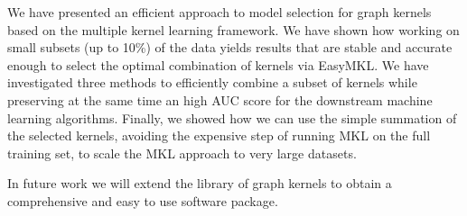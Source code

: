 \documentclass{esannV2}
\newcommand{\1}{{\bf 1}}
\begin{document}
We have presented an efficient approach to model selection for graph kernels
based on the multiple kernel learning framework. We have shown how working on
small subsets (up to 10\%) of the data yields results that are stable and
accurate enough to select the optimal combination of kernels via EasyMKL.
We have investigated three methods to efficiently combine a subset of
kernels while preserving at the same time an high AUC score for the downstream
machine learning algorithms. Finally, we showed how we can use the simple
summation of the selected kernels, avoiding the expensive step of running MKL
on the full training set, to scale the MKL approach to very large
datasets.

In future work we will extend the library of graph kernels to obtain a
comprehensive and easy to use software package.  


\begin{footnotesize}







\end{footnotesize}

\end{document}
